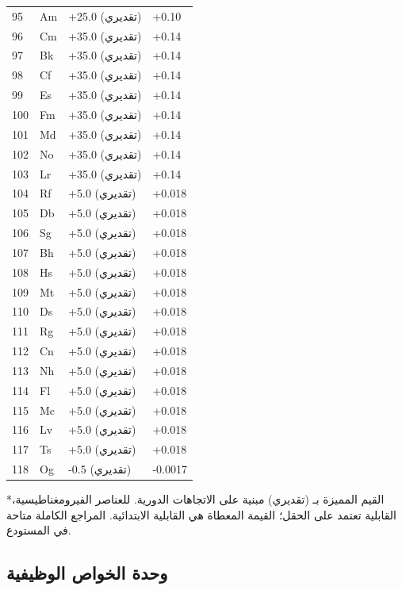 \documentclass[11pt,a4paper]{article}
\begin{document}
\begin{otherlanguage}{arabic}
\begin{longtable}{p{0.6cm}p{1.2cm}p{2.5cm}p{2.5cm}}
			95 & Am & +25.0 (تقديري) & +0.10 \\
			96 & Cm & +35.0 (تقديري) & +0.14 \\
			97 & Bk & +35.0 (تقديري) & +0.14 \\
			98 & Cf & +35.0 (تقديري) & +0.14 \\
			99 & Es & +35.0 (تقديري) & +0.14 \\
			100& Fm & +35.0 (تقديري) & +0.14 \\
			101& Md & +35.0 (تقديري) & +0.14 \\
			102& No & +35.0 (تقديري) & +0.14 \\
			103& Lr & +35.0 (تقديري) & +0.14 \\
			104& Rf & +5.0 (تقديري) & +0.018 \\
			105& Db & +5.0 (تقديري) & +0.018 \\
			106& Sg & +5.0 (تقديري) & +0.018 \\
			107& Bh & +5.0 (تقديري) & +0.018 \\
			108& Hs & +5.0 (تقديري) & +0.018 \\
			109& Mt & +5.0 (تقديري) & +0.018 \\
			110& Ds & +5.0 (تقديري) & +0.018 \\
			111& Rg & +5.0 (تقديري) & +0.018 \\
			112& Cn & +5.0 (تقديري) & +0.018 \\
			113& Nh & +5.0 (تقديري) & +0.018 \\
			114& Fl & +5.0 (تقديري) & +0.018 \\
			115& Mc & +5.0 (تقديري) & +0.018 \\
			116& Lv & +5.0 (تقديري) & +0.018 \\
			117& Ts & +5.0 (تقديري) & +0.018 \\
			118& Og & -0.5 (تقديري) & -0.0017 \\
			\bottomrule
		\end{longtable}
		*القيم المميزة بـ (تقديري) مبنية على الاتجاهات الدورية. للعناصر الفيرومغناطيسية، القابلية تعتمد على الحقل؛ القيمة المعطاة هي القابلية الابتدائية. المراجع الكاملة متاحة في المستودع.
		
		
		\subsection{وحدة الخواص الوظيفية}
		\label{subsec:functional-properties}
		

\end{otherlanguage}
\end{document}
